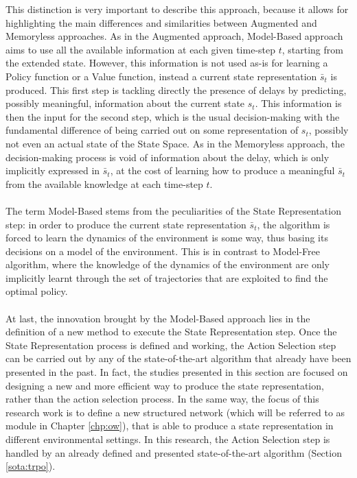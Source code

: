                This distinction is very important to describe this approach, because it allows for highlighting the main differences and similarities between Augmented and Memoryless approaches. As in the Augmented approach, Model-Based approach aims to use all the available information at each given time-step $t$, starting from the extended state. However, this information is not used as-is for learning a Policy function or a Value function, instead a current state representation $\bar{s}_t$ is produced. This first step is tackling directly the presence of delays by predicting, possibly meaningful, information about the current state $s_t$. This information is then the input for the second step, which is the usual decision-making with the fundamental difference of being carried out on some representation of $s_t$, possibly not even an actual state of the State Space. As in the Memoryless approach, the decision-making process is void of information about the delay, which is only implicitly expressed in $\bar{s}_t$, at the cost of learning how to produce a meaningful $\bar{s}_t$ from the available knowledge at each time-step $t$.
                \\\\
                The term Model-Based stems from the peculiarities of the State Representation step: in order to produce the current state representation $\bar{s}_t$, the algorithm is forced to learn the dynamics of the environment is some way, thus basing its decisions on a model of the environment. This is in contrast to Model-Free algorithm, where the knowledge of the dynamics of the environment are only implicitly learnt through the set of trajectories that are exploited to find the optimal policy.
                \\\\
                At last, the innovation brought by the Model-Based approach lies in the definition of a new method to execute the State Representation step. Once the State Representation process is defined and working, the Action Selection step can be carried out by any of the state-of-the-art algorithm that already have been presented in the past. In fact, the studies presented in this section are focused on designing a new and more efficient way to produce the state representation, rather than the action selection process. In the same way, the focus of this research work is to define a new structured network (which will be referred to as module in Chapter \ref{chp:ow}), that is able to produce a state representation in different environmental settings. In this research, the Action Selection step is handled by an already defined and presented state-of-the-art algorithm (Section \ref{sota:trpo}).
                
